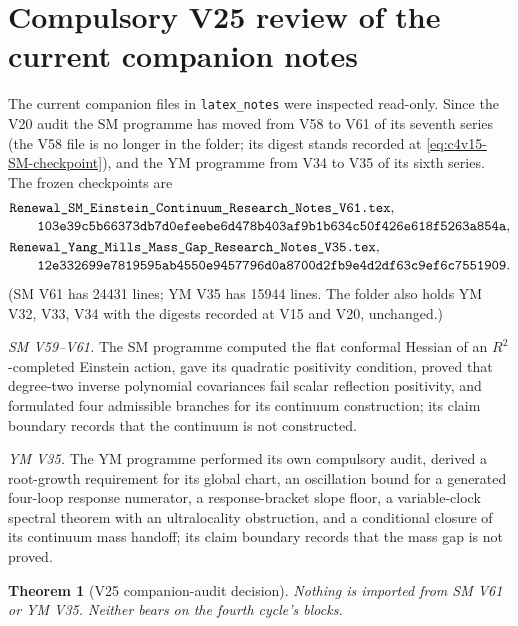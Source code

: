 \documentclass[11pt]{article}
\theoremstyle{plain}
\newtheorem{theorem}{Theorem}[section]
\theoremstyle{definition}
\theoremstyle{remark}
\begin{document}
\section{Compulsory V25 review of the current companion notes}
\label{sec:c4v25-companion-audit}

The current companion files in \texttt{latex\_notes} were inspected
read-only.  Since the V20 audit the SM programme has moved from V58
to V61 of its seventh series (the V58 file is no longer in the folder;
its digest stands recorded at \eqref{eq:c4v15-SM-checkpoint}), and the
YM programme from V34 to V35 of its sixth series.  The frozen
checkpoints are
\begin{align}
 &\texttt{Renewal\_SM\_Einstein\_Continuum\_Research\_Notes\_V61.tex},
 \notag\\[-2pt]
 &\qquad
 \texttt{103e39c5b66373db7d0efeebe6d478b403af9b1b634c50f426e618f5263a854a},
 \label{eq:c4v25-SM-checkpoint}\\
 &\texttt{Renewal\_Yang\_Mills\_Mass\_Gap\_Research\_Notes\_V35.tex},
 \notag\\[-2pt]
 &\qquad
 \texttt{12e332699e7819595ab4550e9457796d0a8700d2fb9e4d2df63c9ef6c7551909}.
 \label{eq:c4v25-YM-checkpoint}
\end{align}
(SM V61 has 24431 lines; YM V35 has 15944 lines.  The folder also
holds YM V32, V33, V34 with the digests recorded at V15 and V20,
unchanged.)

\emph{SM V59--V61.}  The SM programme computed the flat conformal
Hessian of an \(R^2\)-completed Einstein action, gave its quadratic
positivity condition, proved that degree-two inverse polynomial
covariances fail scalar reflection positivity, and formulated four
admissible branches for its continuum construction; its claim
boundary records that the continuum is not constructed.

\emph{YM V35.}  The YM programme performed its own compulsory audit,
derived a root-growth requirement for its global chart, an
oscillation bound for a generated four-loop response numerator, a
response-bracket slope floor, a variable-clock spectral theorem with
an ultralocality obstruction, and a conditional closure of its
continuum mass handoff; its claim boundary records that the mass gap
is not proved.

\begin{theorem}[V25 companion-audit decision]
\label{thm:c4v25-companion-decision}
Nothing is imported from SM V61 or YM V35.  Neither bears on the
fourth cycle's blocks.
\end{theorem}
\end{document}
